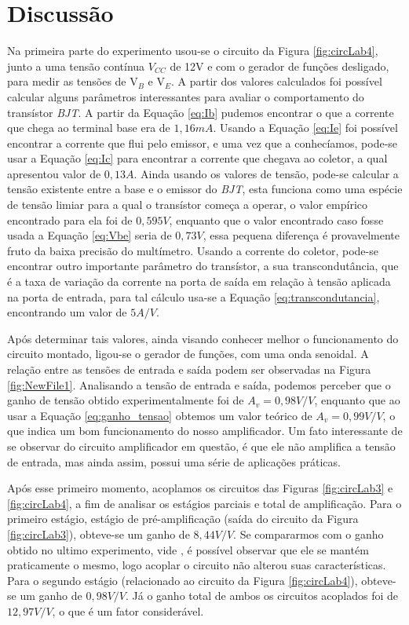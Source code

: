 \documentclass{article}
\begin{document}
    \section{Discussão}
        Na primeira parte do experimento usou-se o circuito da Figura \ref{fig:circLab4}, junto a uma tensão contínua $V_{CC}$ de 12V e com o gerador de funções desligado, para medir as tensões de V$_B$ e V$_E$. A partir dos valores calculados foi possível calcular alguns parâmetros interessantes para avaliar o comportamento do transístor \emph{BJT}. A partir da Equação \ref{eq:Ib} pudemos encontrar o que a corrente que chega ao terminal base era de $1,16 mA$. Usando a Equação \ref{eq:Ie} foi possível encontrar a corrente que flui pelo emissor, e uma vez que a conhecíamos, pode-se usar a Equação \ref{eq:Ic} para encontrar a corrente que chegava ao coletor, a qual apresentou valor de $0,13A$. Ainda usando os valores de tensão, pode-se calcular a tensão existente entre a base e o emissor do \emph{BJT}, esta funciona como uma espécie de tensão limiar para a qual o transístor começa a operar, o valor empírico encontrado para ela foi de $0,595V$, enquanto que o valor encontrado caso fosse usada a Equação \ref{eq:Vbe} seria de $0,73V$, essa pequena diferença é provavelmente fruto da baixa precisão do     multímetro. Usando a corrente do coletor, pode-se encontrar outro importante parâmetro do transístor, a sua transcondutância, que é a taxa de variação da corrente na porta de saída em relação à tensão aplicada na porta de entrada, para tal cálculo usa-se a Equação \ref{eq:transcondutancia}, encontrando um valor de $5 A / V$. 
        
        Após determinar tais valores, ainda visando conhecer melhor o funcionamento do circuito montado, ligou-se o gerador de funções, com uma onda senoidal. A relação entre as tensões de entrada e saída podem ser observadas na Figura \ref{fig:NewFile1}. Analisando a tensão de entrada e saída, podemos perceber que o ganho de tensão obtido experimentalmente foi de $A_v = 0,98 V / V$, enquanto que ao usar a Equação \ref{eq:ganho_tensao} obtemos um valor teórico de $A_v = 0,99 V / V$, o que indica um bom funcionamento do nosso amplificador. Um fato interessante de se observar do circuito amplificador em questão, é que ele não amplifica a tensão de entrada, mas ainda assim, possui uma série de aplicações práticas.
    
        Após esse primeiro momento, acoplamos os circuitos das Figuras \ref{fig:circLab3} e \ref{fig:circLab4}, a fim de analisar os estágios parciais e total de amplificação. Para o primeiro estágio, estágio de pré-amplificação (saída do circuito da Figura \ref{fig:circLab3}), obteve-se um ganho de $8,44 V / V$. Se compararmos com o ganho obtido no ultimo experimento, vide \cite{ref:exp3}, é possível observar que ele se mantém praticamente o mesmo, logo acoplar o circuito não alterou suas características. Para o segundo estágio (relacionado ao circuito da Figura \ref{fig:circLab4}), obteve-se um ganho de $0,98 V / V$. Já o ganho total de ambos os circuitos acoplados foi de $12,97 V / V$, o que é um fator considerável.
        
\end{document}

